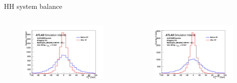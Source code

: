 \begin{frame}{HH system balance}

\begin{columns}
\begin{figure}
    \centering
    \includegraphics[width=1.\textwidth]{BackUp/Part7/Img/pxhh_KF_2Jet_AntiKt4EMTopoJets.png}
\end{figure}
\begin{figure}
    \centering
    \includegraphics[width=1.\textwidth]{BackUp/Part7/Img/pxhh_KF_3Jet_AntiKt4EMTopoJets.png}
\end{figure}
\end{columns}
\end{frame}

